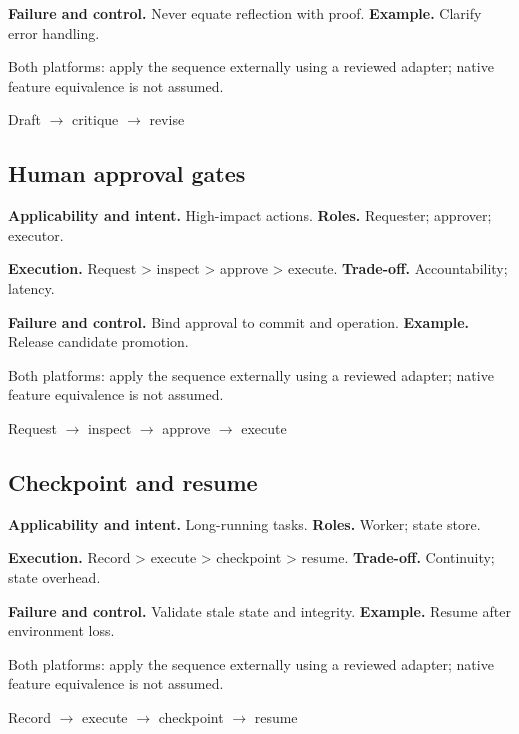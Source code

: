 \textbf{Failure and control.} Never equate reflection with proof. \textbf{Example.} Clarify error handling.

Both platforms: apply the sequence externally using a reviewed adapter; native feature equivalence is not assumed.

\begin{center}\small \textsf{Draft} $\rightarrow$ \textsf{critique} $\rightarrow$ \textsf{revise}\end{center}

\subsection{Human approval gates}

\textbf{Applicability and intent.} High-impact actions. \textbf{Roles.} Requester; approver; executor.

\textbf{Execution.} Request > inspect > approve > execute. \textbf{Trade-off.} Accountability; latency.

\textbf{Failure and control.} Bind approval to commit and operation. \textbf{Example.} Release candidate promotion.

Both platforms: apply the sequence externally using a reviewed adapter; native feature equivalence is not assumed.

\begin{center}\small \textsf{Request} $\rightarrow$ \textsf{inspect} $\rightarrow$ \textsf{approve} $\rightarrow$ \textsf{execute}\end{center}

\subsection{Checkpoint and resume}

\textbf{Applicability and intent.} Long-running tasks. \textbf{Roles.} Worker; state store.

\textbf{Execution.} Record > execute > checkpoint > resume. \textbf{Trade-off.} Continuity; state overhead.

\textbf{Failure and control.} Validate stale state and integrity. \textbf{Example.} Resume after environment loss.

Both platforms: apply the sequence externally using a reviewed adapter; native feature equivalence is not assumed.

\begin{center}\small \textsf{Record} $\rightarrow$ \textsf{execute} $\rightarrow$ \textsf{checkpoint} $\rightarrow$ \textsf{resume}\end{center}

